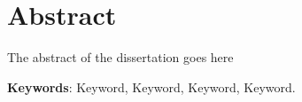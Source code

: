 \chapter*{Abstract} %
{\Huge \calligra T}he abstract of the dissertation goes here

\textbf{Keywords}: Keyword, Keyword, Keyword, Keyword.

